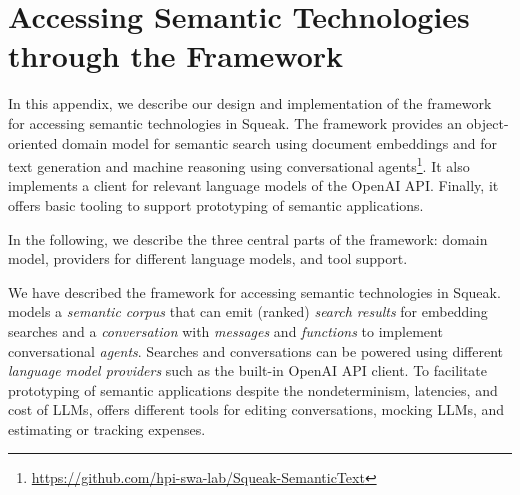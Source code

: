 
\chapter{Accessing Semantic Technologies through the \semtex Framework}
\label{apx:semtex}

In this appendix, we describe our design and implementation of the \semtex framework for accessing semantic technologies in Squeak.
The \semtex framework provides an object-oriented domain model for semantic search using document embeddings and for text generation and machine reasoning using conversational agents\footnote{\url{https://github.com/hpi-swa-lab/Squeak-SemanticText}}.
It also implements a client for relevant language models of the OpenAI API.
Finally, it offers basic tooling to support prototyping of semantic applications.

In the following, we describe the three central parts of the framework: domain model, providers for different language models, and tool support.


\begin{summary}
	We have described the \semtex framework for accessing semantic technologies in Squeak.
	\semtex models a \emph{semantic corpus} that can emit (ranked) \emph{search results} for embedding searches and a \emph{conversation} with \emph{messages} and \emph{functions} to implement conversational \emph{agents}.
	Searches and conversations can be powered using different \emph{language model providers} such as the built-in OpenAI API client.
	To facilitate prototyping of semantic applications despite the nondeterminism, latencies, and cost of LLMs, \semtex offers different tools for editing conversations, mocking LLMs, and estimating or tracking expenses.
\end{summary}
